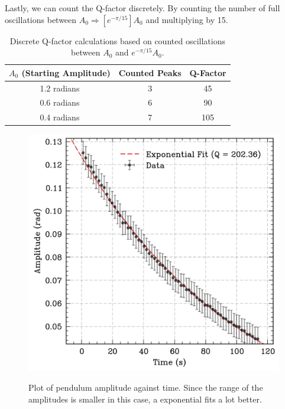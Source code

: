 \documentclass[prl,twocolumn,amsmath,amssymb,superscriptaddress]{revtex4-2}
\begin{document}
Lastly, we can count the Q-factor discretely. By counting the number of full oscillations between $A_0 \Rightarrow [e^{-\pi/15}]A_0$ and multiplying by 15.

\begin{table}[htb]
    \centering
    \caption{Discrete Q-factor calculations based on counted oscillations between $A_0$ and $e^{-\pi/15}A_0$.}
    \vspace{10pt}
    \begin{tabular}{|c|c|c|}
        \hline
        $A_0$ (Starting Amplitude) & Counted Peaks & Q-Factor \\
        \hline
        1.2 radians & 3 & 45 \\
        0.6 radians & 6 & 90 \\
        0.4 radians & 7 & 105 \\
        \hline
    \end{tabular}
    \label{tab:q_factor}
\end{table}

\begin{figure}[htb]
    \includegraphics[width=0.8\linewidth]{low_angle_q.png}
    \label{fig:decay_small_angle}
    \caption{Plot of pendulum amplitude against time. Since the range of the amplitudes is smaller in this case, a exponential fits a lot better.}
\end{figure}
\end{document}
